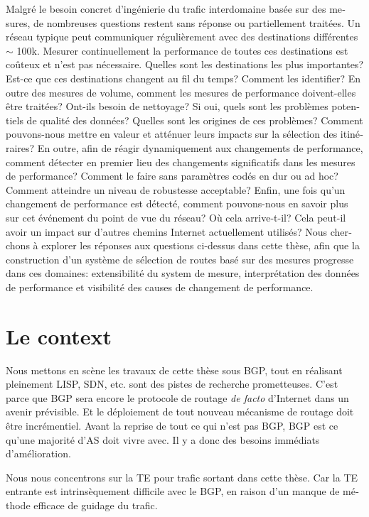 \begin{otherlanguage}{french}
Malgré le besoin concret d'ingénierie du trafic interdomaine basée sur des mesures, de nombreuses questions restent sans réponse ou partiellement traitées.
Un réseau typique peut communiquer régulièrement avec des destinations différentes $\sim$ 100k.
Mesurer continuellement la performance de toutes ces destinations est coûteux et n'est pas nécessaire.
Quelles sont les destinations les plus importantes? Est-ce que ces destinations changent au fil du temps? Comment les identifier?
En outre des mesures de volume, comment les mesures de performance doivent-elles être traitées? Ont-ils besoin de nettoyage?
Si oui, quels sont les problèmes potentiels de qualité des données? Quelles sont les origines de ces problèmes? Comment pouvons-nous mettre en valeur et atténuer leurs impacts sur la sélection des itinéraires?
En outre, afin de réagir dynamiquement aux changements de performance, comment détecter en premier lieu des changements significatifs dans les mesures de performance? Comment le faire sans paramètres codés en dur ou ad hoc? Comment atteindre un niveau de robustesse acceptable?
Enfin, une fois qu'un changement de performance est détecté, comment pouvons-nous en savoir plus sur cet événement du point de vue du réseau? Où cela arrive-t-il? Cela peut-il avoir un impact sur d'autres chemins Internet actuellement utilisés?
Nous cherchons à explorer les réponses aux questions ci-dessus dans cette thèse, afin que la construction d'un système de sélection de routes basé sur des mesures progresse dans ces domaines: extensibilité du system de mesure, interprétation des données de performance et visibilité des causes de changement de performance.


\section*{Le context}
Nous mettons en scène les travaux de cette thèse sous BGP, tout en réalisant pleinement \ac{LISP}, \ac{SDN}, etc. sont des pistes de recherche prometteuses.
C'est parce que BGP sera encore le protocole de routage \textit {de facto} d'Internet dans un avenir prévisible.
Et le déploiement de tout nouveau mécanisme de routage doit être incrémentiel.
Avant la reprise de tout ce qui n'est pas BGP, BGP est ce qu'une majorité d'AS doit vivre avec.
Il y a donc des besoins immédiats d'amélioration.

Nous nous concentrons sur la TE pour trafic sortant dans cette thèse.
Car la TE entrante est intrinsèquement difficile avec le BGP, en raison d'un manque de méthode efficace de guidage du trafic.


\end{otherlanguage}

